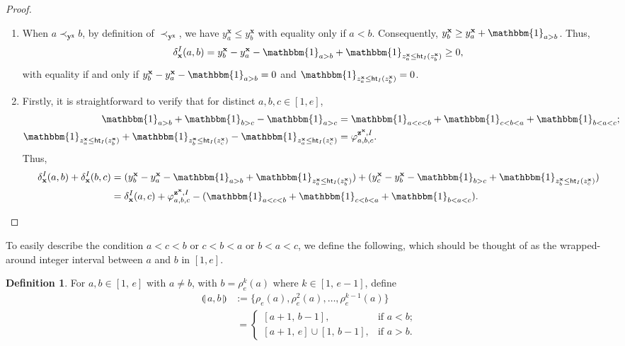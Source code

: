 \documentclass[11pt,a4paper,reqno]{amsart}
\numberwithin{equation}{section}
\theoremstyle{plain}
\theoremstyle{definition}
\newtheorem{Def}[thm]{Definition}
\theoremstyle{remark}
\numberwithin{equation}{section}
\newcommand{\bbone}{\mathbbm{1}}
\newcommand{\bx}{\mathbf{x}}
\newcommand{\by}{\mathbf{y}}
\newcommand{\bz}{\mathbf{z}}
\newcommand{\rr}{\rho}
\newcommand{\ff}{\varphi}
\newcommand{\Ht}{\mathsf{ht}}
\newcommand{\ft}[2]{\llparenthesis\, #1,#2 \,\rrparenthesis}
\begin{document}
\begin{proof}  \hfill
\begin{enumerate}
\item When $a \prec_{\by^{\bx}} b$, by definition of $\prec_{\by^{\bx}}$, we have $y^{\bx}_a \leq y^{\bx}_b$ with equality only if $a < b$.
    Consequently, $y^{\bx}_{b} \geq y^{\bx}_{a} + \bbone_{a > b}$.
    Thus,
    $$
    \delta_{\bx}^I(a,b) = y^{\bx}_{b} - y^{\bx}_{a} - \bbone_{a > b} + \bbone_{z^{\bx}_a \leq \Ht_I(z^{\bx}_b)} \geq 0,
    $$
    with equality if and only if $y^{\bx}_{b} - y^{\bx}_{a} - \bbone_{a > b} = 0$ and $\bbone_{z^{\bx}_a \leq \Ht_I(z^{\bx}_b)} = 0$.



\item
Firstly, it is straightforward to verify that for distinct $a,b,c \in [1,e]$,
\begin{align*}
\bbone_{a > b} + \bbone_{b > c} - \bbone_{a > c} &= \bbone_{a < c < b} + \bbone_{c < b < a} + \bbone_{b < a < c}; \\
\bbone_{z^{\bx}_a \leq \Ht_I(z^{\bx}_b)} + \bbone_{z^{\bx}_b \leq \Ht_I(z^{\bx}_c)} - \bbone_{z^{\bx}_a \leq \Ht_I(z^{\bx}_c)} & = \ff^{\bz^{\bx},I}_{a,b,c}.
\end{align*}
Thus,
\begin{align*}
\delta_{\bx}^I(a,b) + \delta_{\bx}^I(b,c) &=
(y^{\bx}_{b} - y^{\bx}_{a} - \bbone_{a > b} + \bbone_{z^{\bx}_a \leq \Ht_I(z^{\bx}_b)})
+
(y^{\bx}_{c} - y^{\bx}_{b} - \bbone_{b > c} + \bbone_{z^{\bx}_b \leq \Ht_I(z^{\bx}_c)}) \\
&= \delta_{\bx}^I(a,c) + \ff^{\bz^{\bx},I}_{a,b,c} - (\bbone_{a < c < b} + \bbone_{c < b < a} + \bbone_{b < a < c}). %
\end{align*}
\end{enumerate}
\end{proof}

To easily describe the condition $a < c < b$ or $c < b < a$ or $b < a < c$, we define the following, which should be thought of as the wrapped-around integer interval between $a$ and $b$ in $[1,e]$.


\begin{Def}
For $a,b \in [1,\,e]$ with $a \ne b$, with $b = \rr_e^{k}(a)$ where $k \in [1,\, e-1]$, define
\begin{align*}
\ft{a}{b} %
& :=
\{ \rr_e(a), \rr_e^2(a), \dotsc, \rr_e^{k-1}(a) \} \\
&\ =\begin{cases}
[a+1,\, b-1], &\text{if } a < b; \\
[a+1,\,e] \cup [1,\,b-1], &\text{if } a > b.
\end{cases}
\end{align*}
\end{Def}
\end{document}
